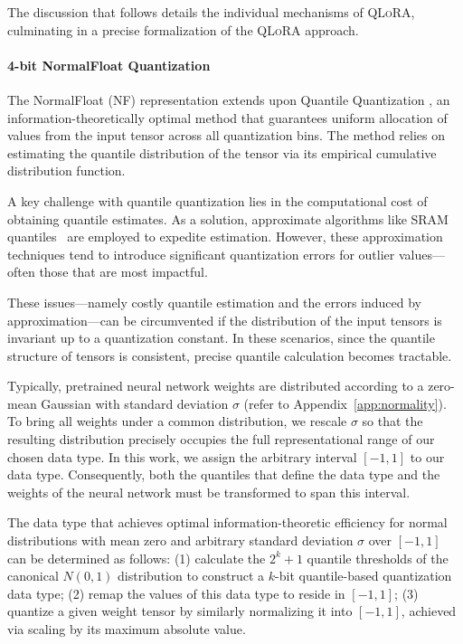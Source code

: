 The discussion that follows details the individual mechanisms of \textsc{QLoRA}, culminating in a precise formalization of the \textsc{QLoRA} approach.

\paragraph{4-bit NormalFloat Quantization} The NormalFloat (NF) representation extends upon Quantile Quantization \citep{dettmers2022optimizers}, an information-theoretically optimal method that guarantees uniform allocation of values from the input tensor across all quantization bins. The method relies on estimating the quantile distribution of the tensor via its empirical cumulative distribution function.

A key challenge with quantile quantization lies in the computational cost of obtaining quantile estimates. As a solution, approximate algorithms like SRAM quantiles~\citep{dettmers2022optimizers} are employed to expedite estimation. However, these approximation techniques tend to introduce significant quantization errors for outlier values—often those that are most impactful.

These issues—namely costly quantile estimation and the errors induced by approximation—can be circumvented if the distribution of the input tensors is invariant up to a quantization constant. In these scenarios, since the quantile structure of tensors is consistent, precise quantile calculation becomes tractable.

Typically, pretrained neural network weights are distributed according to a zero-mean Gaussian with standard deviation $\sigma$ (refer to Appendix~\ref{app:normality}). To bring all weights under a common distribution, we rescale $\sigma$ so that the resulting distribution precisely occupies the full representational range of our chosen data type. In this work, we assign the arbitrary interval $[-1, 1]$ to our data type. Consequently, both the quantiles that define the data type and the weights of the neural network must be transformed to span this interval.

The data type that achieves optimal information-theoretic efficiency for normal distributions with mean zero and arbitrary standard deviation $\sigma$ over $[-1, 1]$ can be determined as follows: (1) calculate the $2^k+1$ quantile thresholds of the canonical $N(0, 1)$ distribution to construct a $k$-bit quantile-based quantization data type; (2) remap the values of this data type to reside in $[-1, 1]$; (3) quantize a given weight tensor by similarly normalizing it into $[-1, 1]$, achieved via scaling by its maximum absolute value.

